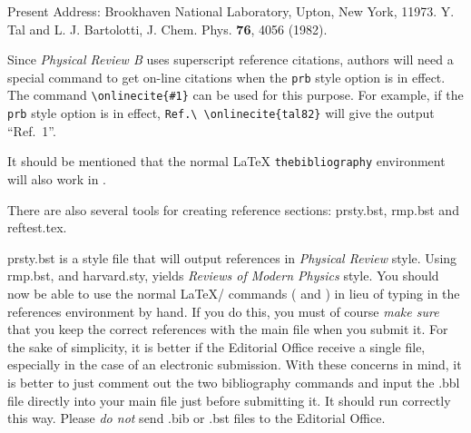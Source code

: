 \begin{references}
Present Address: Brookhaven
National Laboratory, Upton, New York, 11973.
Y. Tal and L. J. Bartolotti,
J. Chem. Phys. {\bf 76}, 4056 (1982).
\end{references}

\smallskip

Since {\em Physical Review B\/} uses superscript reference citations,
authors will need a special command to get on-line citations when the
\verb+prb+ style option is in effect. The command \verb+\onlinecite{#1}+
can be used for this purpose. For example, if the \verb+prb+ style option
is in effect, \verb+Ref.\ \onlinecite{tal82}+ will give the output ``Ref.\
1''.

It should be mentioned that the normal \LaTeX{} \verb+thebibliography+
environment will also work in \REVTeX{}.

\bigskip

There are also several tools for creating reference sections:
prsty.bst, rmp.bst and reftest.tex.

prsty.bst is a \BibTeX{} style file that will output references in {\em
Physical Review\/} style. Using rmp.bst, and harvard.sty, yields {\em
Reviews of Modern Physics} style. You should now be able to use the normal
\LaTeX/\BibTeX{} commands (\verb++ and
\verb++) in lieu of typing in the references environment
by hand.  If you do this, you must of course {\em make sure\/} that you
keep the correct references with the main file when you submit it. For the
sake of simplicity, it is better if the Editorial Office receive a single
file, especially in the case of an electronic submission. With these
concerns in mind, it is better to just comment out the two bibliography
commands and input the .bbl file directly into your main file just before
submitting it. It should run correctly this way. Please {\em do not\/} send
 .bib or .bst files to the Editorial Office.

